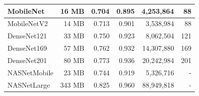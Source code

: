 \begin{table}[h!]
\begin{tabular}{|l|r|r|r|r|r|}
    MobileNet                                                    & 16 MB                              & 0.704                                                                                   & 0.895                                                                                   & 4,253,864                                & 88                                  \\ \hline
    MobileNetV2                                                  & 14 MB                              & 0.713                                                                                   & 0.901                                                                                   & 3,538,984                                & 88                                  \\ \hline
    DenseNet121                                                  & 33 MB                              & 0.750                                                                                   & 0.923                                                                                   & 8,062,504                                & 121                                 \\ \hline
    DenseNet169                                                  & 57 MB                              & 0.762                                                                                   & 0.932                                                                                   & 14,307,880                               & 169                                 \\ \hline
    DenseNet201                                                  & 80 MB                              & 0.773                                                                                   & 0.936                                                                                   & 20,242,984                               & 201                                 \\ \hline
    NASNetMobile                                                 & 23 MB                              & 0.744                                                                                   & 0.919                                                                                   & 5,326,716                                & -                                   \\ \hline
    NASNetLarge                                                  & 343 MB                             & 0.825                                                                                   & 0.960                                                                                   & 88,949,818                               & -                                   \\ \hline

\end{tabular}
\end{table}
